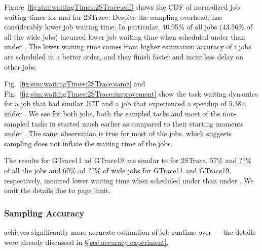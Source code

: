 
Figure~\ref{fig:sim:waitingTimes:2STrace:cdf} shows the CDF of
normalized job waiting times for \slearn and \primarybasepredict for
2STrace.  Despite the sampling overhead, \slearn has considerably
lower job waiting time.  In particular, 40.95\% 
  of all jobs (43.56\%
of all the wide jobs) incurred lower job waiting time when scheduled
under \slearn than under \primarybasepredict.  The lower waiting time
comes from higher estimation accuracy of \slearn: jobs are scheduled
in a better order, and they finish faster and incur less delay on
other jobs.

Fig.~\ref{fig:sim:waitingTimes:2STrace:same} and
Fig.~\ref{fig:sim:waitingTimes:2STrace:improvement} show the task waiting
dynamics for a job that had similar JCT and a job that experienced a speedup of
5.38$\times$ under \slearn.  We see for both jobs, both the sampled tasks and
most of the non-sampled tasks in \slearn started much earlier as compared to
their starting moments under \primarybasepredict.  The same observation is true
for most of the jobs, which suggests sampling does not inflate the waiting time
of the jobs.

  {The results for GTrace11 ad GTrace19 are
    similar to for 2STrace.  57\% and ??\% of all the jobs and 60\% ad ??\% of wide
    jobs for GTrace11 and GTrace19, respectively,
    incurred lower waiting time when scheduled under
    \slearn than under \primarybasepredict. We omit the details due to
    page limit.
}

  \subsubsection{Sampling Accuracy}
\label{sec:sim:accuracy}

\slearn achieves significantly more accurate estimation of job runtime over 
\primarybasepredict\ --
the details were already discussed in \S\ref{sec:accuracy:experiment}.

